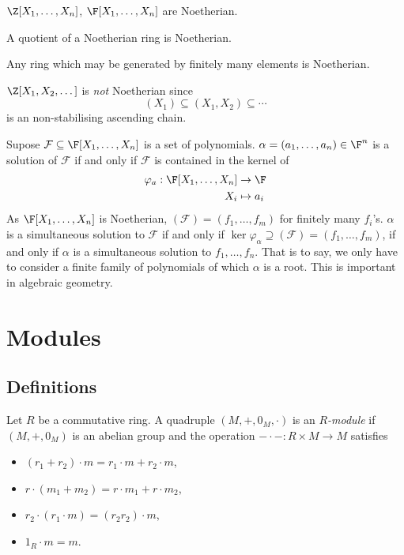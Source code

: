 \documentclass[a4paper]{article}
\theoremstyle{definition}
\begin{document}
\begin{eg}
  \(\Z[X_1, \dots, X_n]\), \(\F[X_1, \dots, X_n]\) are Noetherian.
\end{eg}

\begin{lemma}
  A quotient of a Noetherian ring is Noetherian.
\end{lemma}

\begin{corollary}
  Any ring which may be generated by finitely many elements is Noetherian.
\end{corollary}

\begin{eg}
  \(\Z[X_1, X_2, \dots]\) is \emph{not} Noetherian since
  \[
    (X_1) \subseteq (X_1, X_2) \subseteq \cdots
  \]
  is an non-stabilising ascending chain.
\end{eg}

\begin{remark}
  Supose \(\mathcal F \subseteq \F[X_1, \dots, X_n]\) is a set of polynomials. \(\alpha = (a_1, \dots, a_n) \in \F^n\) is a solution of \(\mathcal F\) if and only if \(\mathcal F\) is contained in the kernel of
  \begin{align*}
    \varphi_a: \F[X_1, \dots, X_n] &\to \F \\
    X_i &\mapsto a_i
  \end{align*}
  As \(\F[X_1, \dots, X_n]\) is Noetherian, \((\mathcal F) = (f_1, \dots, f_m)\) for finitely many \(f_i\)'s. \(\alpha\) is a simultaneous solution to \(\mathcal F\) if and only if \(\ker \varphi_\alpha \supseteq (\mathcal F) = (f_1, \dots, f_m)\), if and only if \(\alpha\) is a simultaneous solution to \(f_1, \dots, f_n\). That is to say, we only have to consider a finite family of polynomials of which \(\alpha\) is a root. This is important in algebraic geometry.
\end{remark}

\section{Modules}

\subsection{Definitions}

\begin{definition}[Module]
  Let \(R\) be a commutative ring. A quadruple \((M, +, 0_M, \cdot)\) is an \emph{\(R\)-module} if \((M, +, 0_M)\) is an abelian group and the operation \(- \cdot -: R \times M \to M\) satisfies
  \begin{itemize}
  \item \((r_1 + r_2) \cdot m = r_1 \cdot m + r_2 \cdot m\),
  \item \(r \cdot (m_1 + m_2) = r \cdot m_1 + r \cdot m_2\),
  \item \(r_2 \cdot (r_1 \cdot m) = (r_2r_2) \cdot m\),
  \item \(1_R \cdot m = m\).
  \end{itemize}
\end{definition}
\end{document}
